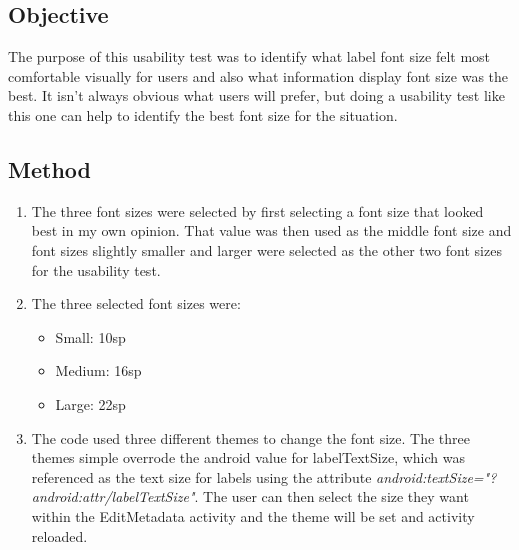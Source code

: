 \documentclass[11pt,english,numbers=endperiod,parskip=half]{scrartcl}
\begin{document}
\subsection{Objective}
The purpose of this usability test was to identify what label font size felt most comfortable visually for users and also what information display font size was the best. It isn't always obvious what users will prefer, but doing a usability test like this one can help to identify the best font size for the situation.
\subsection{Method}
\begin{enumerate}
	\item{The three font sizes were selected by first selecting a font size that looked best in my own opinion. That value was then used as the middle font size and font sizes slightly smaller and larger were selected as the other two font sizes for the usability test.}
	\item{The three selected font sizes were:
		\begin{itemize}
			\item{Small: 10sp}
			\item{Medium: 16sp}
			\item{Large: 22sp}
		\end{itemize}
	}
	\item{The code used three different themes to change the font size. The three themes simple overrode the android value for labelTextSize, which was referenced as the text size for labels using the attribute \textit{android:textSize="?android:attr/labelTextSize"}. The user can then select the size they want within the EditMetadata activity and the theme will be set and activity reloaded.}
\end{enumerate}
\end{document}
